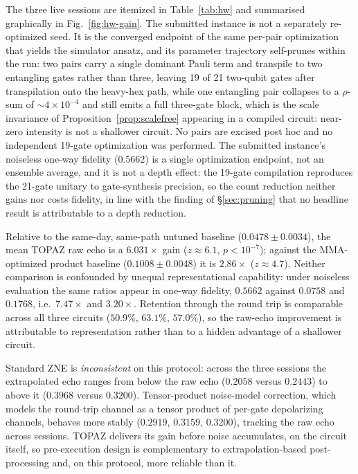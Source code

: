 \documentclass[twocolumn,aps,prl,superscriptaddress,showkeys]{revtex4-2}
\theoremstyle{plain}
\theoremstyle{definition}
\begin{document}
The three live sessions are itemized in Table~\ref{tab:hw} and summarised graphically in Fig.~\ref{fig:hw-gain}. The submitted instance is not a separately re-optimized seed. It is the converged endpoint of the same per-pair optimization that yields the simulator ansatz, and its parameter trajectory self-prunes within the run: two pairs carry a single dominant Pauli term and transpile to two entangling gates rather than three, leaving 19 of 21 two-qubit gates after transpilation onto the heavy-hex path, while one entangling pair collapses to a $\rho$-sum of $\sim\!4\times10^{-4}$ and still emits a full three-gate block, which is the scale invariance of Proposition~\ref{prop:scalefree} appearing in a compiled circuit: near-zero intensity is not a shallower circuit. No pairs are excised post hoc and no independent 19-gate optimization was performed. The submitted instance's noiseless one-way fidelity ($0.5662$) is a single optimization endpoint, not an ensemble average, and it is not a depth effect: the 19-gate compilation reproduces the 21-gate unitary to gate-synthesis precision, so the count reduction neither gains nor costs fidelity, in line with the finding of \S\ref{sec:pruning} that no headline result is attributable to a depth reduction.

Relative to the same-day, same-path untuned baseline ($0.0478\pm0.0034$), the mean TOPAZ raw echo is a $6.031\times$ gain ($z\approx6.1$, $p<10^{-7}$); against the MMA-optimized product baseline ($0.1008\pm0.0048$) it is $2.86\times$ ($z\approx4.7$). Neither comparison is confounded by unequal representational capability: under noiseless evaluation the same ratios appear in one-way fidelity, $0.5662$ against $0.0758$ and $0.1768$, i.e.\ $7.47\times$ and $3.20\times$. Retention through the round trip is comparable across all three circuits ($50.9\%$, $63.1\%$, $57.0\%$), so the raw-echo improvement is attributable to representation rather than to a hidden advantage of a shallower circuit.

Standard ZNE is \emph{inconsistent} on this protocol: across the three sessions the extrapolated echo ranges from below the raw echo ($0.2058$ versus $0.2443$) to above it ($0.3968$ versus $0.3200$). Tensor-product noise-model correction, which models the round-trip channel as a tensor product of per-gate depolarizing channels, behaves more stably ($0.2919$, $0.3159$, $0.3200$), tracking the raw echo across sessions. TOPAZ delivers its gain before noise accumulates, on the circuit itself, so pre-execution design is complementary to extrapolation-based post-processing and, on this protocol, more reliable than it.
\end{document}
